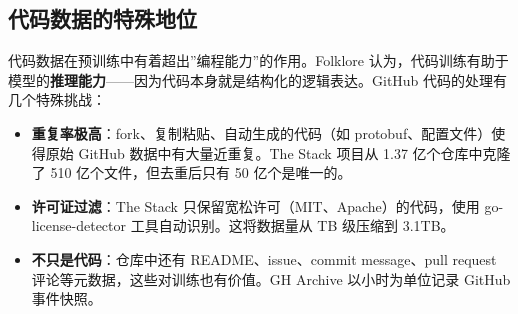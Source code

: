 \subsection{代码数据的特殊地位}

代码数据在预训练中有着超出”编程能力”的作用。Folklore 认为，代码训练有助于模型的\textbf{推理能力}——因为代码本身就是结构化的逻辑表达。GitHub 代码的处理有几个特殊挑战：

\begin{itemize}
    \item \textbf{重复率极高}：fork、复制粘贴、自动生成的代码（如 protobuf、配置文件）使得原始 GitHub 数据中有大量近重复。The Stack 项目从 1.37 亿个仓库中克隆了 510 亿个文件，但去重后只有 50 亿个是唯一的。
    \item \textbf{许可证过滤}：The Stack 只保留宽松许可（MIT、Apache）的代码，使用 go-license-detector 工具自动识别。这将数据量从 TB 级压缩到 3.1TB。
    \item \textbf{不只是代码}：仓库中还有 README、issue、commit message、pull request 评论等元数据，这些对训练也有价值。GH Archive 以小时为单位记录 GitHub 事件快照。
\end{itemize}

